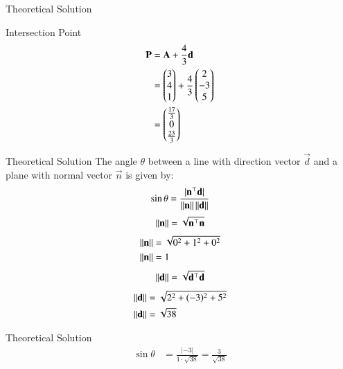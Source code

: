 \documentclass{beamer}
\begin{document}
\begin{frame}{Theoretical Solution}

Intersection Point
\begin{align}
\mathbf{P} &= \mathbf{A} + \frac{4}{3}\mathbf{d}\\
&=\begin{pmatrix}3 \\ 4 \\ 1\end{pmatrix} + \frac{4}{3}\begin{pmatrix}2 \\ -3 \\ 5\end{pmatrix}\\
& = \begin{pmatrix}\frac{17}{3} \\ 0 \\ \frac{23}{3}\end{pmatrix}
\end{align}

\end{frame}
\begin{frame}{Theoretical Solution}
The angle $\theta$ between a line with direction vector $\vec{d}$ and a plane with normal vector $\vec{n}$ is given by:
\begin{align}
\sin\theta = \frac{|\mathbf{n}^\top \mathbf{d}|}{\left\lVert\mathbf{n}\right\rVert\left\lVert\mathbf{d}\right\rVert}
\end{align}
\begin{align}
\left\lVert\mathbf{n}\right\rVert=\sqrt{\mathbf{n}^\top\mathbf{n}}
\end{align}
\begin{align}
\left\lVert\mathbf{n}\right\rVert&=\sqrt{0^2 + 1^2 + 0^2}\\
\left\lVert\mathbf{n}\right\rVert&= 1
\end{align}
\begin{align}
\left\lVert\mathbf{d}\right\rVert=\sqrt{\mathbf{d}^\top\mathbf{d}}
\end{align}
\begin{align}
\left\lVert\mathbf{d}\right\rVert&= \sqrt{2^2 + (-3)^2 + 5^2}\\
\left\lVert\mathbf{d}\right\rVert&=\sqrt{38}
\end{align}
\end{frame}
\begin{frame}{Theoretical Solution}
\begin{align}
    \sin\theta &= \frac{|-3|}{1 \cdot \sqrt{38}} = \frac{3}{\sqrt{38}}
\end{align}
\end{frame}
\end{document}
